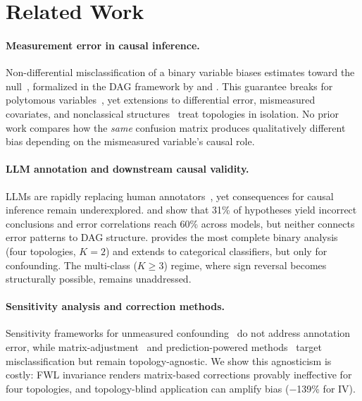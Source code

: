 \section{Related Work}
\label{sec:related_work}

\paragraph{Measurement error in causal inference.}
Non-differential misclassification of a binary variable biases estimates toward the null~\cite{bross1954misclassification, brenner1993, ogburn_vanderweele2012}, formalized in the DAG framework by \citet{hernan_cole2009} and \citet{kuroki_pearl2014}. This guarantee breaks for polytomous variables~\cite{dosemeci1990, jurek2005, veirod_laake2001}, yet extensions to differential error, mismeasured covariates, and nonclassical structures~\cite{brennan_getz_brooks_fox2021, shu_yi2019a, valeri_vanderweele2013, schennach2020mismeasured} treat topologies in isolation. No prior work compares how the \emph{same} confusion matrix produces qualitatively different bias depending on the mismeasured variable's causal role.

\paragraph{LLM annotation and downstream causal validity.}
LLMs are rapidly replacing human annotators~\cite{gilardi2023chatgpt, ziems2024can, tan2024llm}, yet consequences for causal inference remain underexplored. \citet{baumann2025} and \citet{kim_garg2025} show that 31\% of hypotheses yield incorrect conclusions and error correlations reach 60\% across models, but neither connects error patterns to DAG structure. \citet{teblunthuis2024} provides the most complete binary analysis (four topologies, $K{=}2$) and \citet{lee_wood_doughty2024} extends to categorical classifiers, but only for confounding. The multi-class ($K{\geq}3$) regime, where sign reversal becomes structurally possible, remains unaddressed.

\paragraph{Sensitivity analysis and correction methods.}
Sensitivity frameworks for unmeasured confounding~\cite{vanderweele_ding2017, cinelli2020making, oster2019} do not address annotation error, while matrix-adjustment~\cite{blackwell_honaker_king2017, lash2009} and prediction-powered methods~\cite{angelopoulos2023, egami_hinck_stewart_wei2023, zrnic_candes2024, gligoric2025} target misclassification but remain topology-agnostic. We show this agnosticism is costly: FWL invariance renders matrix-based corrections provably ineffective for four topologies, and topology-blind application can amplify bias ($-$139\% for IV).
